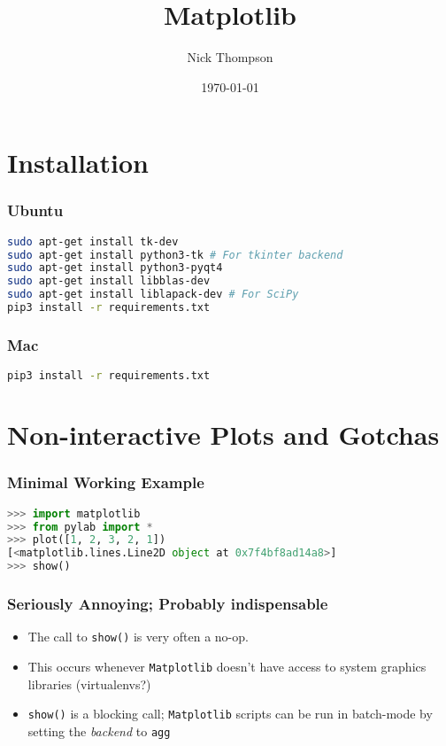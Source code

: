 \documentclass{beamer}
\begin{document}
\title{Matplotlib}
\author{Nick Thompson} 
\date{\today} 

\frame{\titlepage} 



\section{Installation} 

\begin{frame}[fragile]
\frametitle{Ubuntu}

\begin{lstlisting}[language=bash]
sudo apt-get install tk-dev
sudo apt-get install python3-tk # For tkinter backend
sudo apt-get install python3-pyqt4
sudo apt-get install libblas-dev
sudo apt-get install liblapack-dev # For SciPy
pip3 install -r requirements.txt
\end{lstlisting}
\end{frame}

\begin{frame}[fragile]
\frametitle{Mac}
\begin{lstlisting}[language=bash]
pip3 install -r requirements.txt
\end{lstlisting}
\end{frame}

\section{Non-interactive Plots and Gotchas}
\begin{frame}[fragile]
\frametitle{Minimal Working Example}
\begin{lstlisting}[language=Python]
>>> import matplotlib
>>> from pylab import *
>>> plot([1, 2, 3, 2, 1])
[<matplotlib.lines.Line2D object at 0x7f4bf8ad14a8>]
>>> show()
\end{lstlisting}
\end{frame}

\begin{frame}
\frametitle{Seriously Annoying; Probably indispensable}
\begin{itemize}
\item The call to \texttt{show()} is very often a no-op.

\item This occurs whenever \texttt{Matplotlib} doesn't have access to system graphics libraries (virtualenvs?)


\item \texttt{show()} is a blocking call; \texttt{Matplotlib} scripts can be run in batch-mode by setting the \emph{backend} to \texttt{agg}
\end{itemize}
\end{frame}
\end{document}

